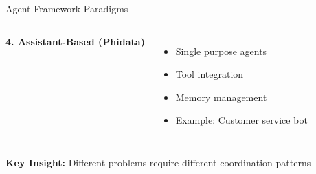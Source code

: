 \documentclass[aspectratio=169,11pt]{beamer}
\begin{document}
\begin{frame}{Agent Framework Paradigms}
\begin{columns}
\textbf{4. Assistant-Based (Phidata)}
\begin{itemize}
    \item Single purpose agents
    \item Tool integration
    \item Memory management
    \item Example: Customer service bot
\end{itemize}
\end{columns}

\vspace{0.3cm}
\begin{center}
\colorbox{yellow!20}{\textbf{Key Insight:} Different problems require different coordination patterns}
\end{center}
\end{frame}
\end{document}
